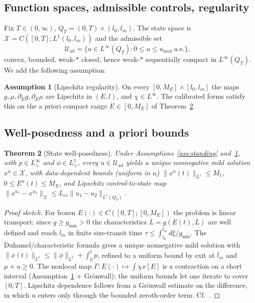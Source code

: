 \documentclass[pdflatex,sn-mathphys-num]{sn-jnl}
\newcommand{\Uad}{\mathcal{U}_{\mathrm{ad}}}
\newcommand{\X}{\mathcal{X}}
\newcommand{\Qt}{Q_T}
\theoremstyle{thmstyleone}
\newtheorem{theorem}{Theorem}[section]
\theoremstyle{definition}
\newtheorem{assumption}[theorem]{Assumption}
\theoremstyle{remark}
\begin{document}
\subsection{Function spaces, admissible controls, regularity}
Fix $T\in(0,\infty)$, $\Qt=(0,T)\times(l_0,l_m)$. The state space is
$\X=C([0,T];L^1(l_0,l_m))$ and the admissible set
\[
\Uad=\{u\in L^\infty(\Qt):0\le u\le u_{\max}\ \text{a.e.}\},
\]
convex, bounded, weak-$\ast$ closed, hence weak-$\ast$ sequentially compact in
$L^\infty(\Qt)$. We add the following assumption:
\begin{assumption}[Lipschitz regularity]\label{ass:lip}
On every $[0,M_E]\times[l_0,l_m]$ the maps $g,\mu,\partial_E g,\partial_E\mu$ are
Lipschitz in $(E,l)$, and $\chi\in L^\infty$. The calibrated forms satisfy this on
the a priori compact range $E\in[0,M_E]$ of Theorem~\ref{thm:wp}.
\end{assumption}

\subsection{Well-posedness and a priori bounds}
\begin{theorem}[State well-posedness]\label{thm:wp}
Under Assumptions~\ref{ass:standing} and~\ref{ass:lip}, with $p\in L^\infty_+$
and $\phi\in L^1_+$, every $u\in\Uad$ yields a unique nonnegative mild solution
$x^u\in\X$, with data-dependent bounds (uniform in $u$)
$\|x^u(t)\|_{L^1}\le M_1$, $0\le E^u(t)\le M_E$, and Lipschitz control-to-state
map $\|x^{u_1}-x^{u_2}\|_\X\le L_{cs}\|u_1-u_2\|_{L^1(\Qt)}$.
\end{theorem}
\begin{proof}[Proof sketch]
For frozen $E(\cdot)\in C([0,T];[0,M_E])$ the problem is linear transport; since
$g\ge g_{\min}>0$ the characteristics $\dot L=g(E(t),L)$ are well defined and reach
$l_m$ in finite size-transit time $\tau\le\int_{l_0}^{l_m}d\xi/g_{\min}$. The
Duhamel/characteristic formula gives a unique nonnegative mild solution with
$\|x(t)\|_{L^1}\le\|\phi\|_{L^1}+\int_0^t p$, refined to a uniform bound by exit at
$l_m$ and $\mu+u\ge0$. The nonlocal map $\Gamma:E(\cdot)\mapsto\int\chi x[E]$ is a
contraction on a short interval (Assumption~\ref{ass:lip} + Gr\"onwall); the uniform
bounds let one iterate to cover $[0,T]$. Lipschitz dependence follows from a
Gr\"onwall estimate on the difference, in which $u$ enters only through the bounded
zeroth-order term. Cf.\ \cite{webb_theory_1985,anita_analysis_2000,liu2026ftu}.
\end{proof}
\end{document}
